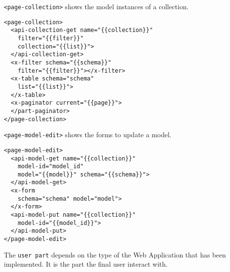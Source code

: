 \texttt{<page-collection>} shows the model instances of a collection.

\begin{lstlisting}[language=HTML5]
<page-collection>
  <api-collection-get name="{{collection}}" 
    filter="{{filter}}"
    collection="{{list}}">
  </api-collection-get>
  <x-filter schema="{{schema}}"
    filter="{{filter}}"></x-filter>
  <x-table schema="schema" 
    list="{{list}}">
  </x-table>
  <x-paginator current="{{page}}">
  </part-paginator>
</page-collection>
\end{lstlisting}

\texttt{<page-model-edit>} shows the forms to update a model.

\begin{lstlisting}[language=HTML5]
<page-model-edit>
  <api-model-get name="{{collection}}"
    model-id="model_id"
    model="{{model}}" schema="{{schema}}">
  </api-model-get>
  <x-form 
    schema="schema" model="model">
  </x-form>
  <api-model-put name="{{collection}}"
    model-id="{{model_id}}">
  </api-model-put>
</page-model-edit>
\end{lstlisting}

The \texttt{user part} depends on the type of the Web Application that has been implemented.
It is the part the final user interact with.


